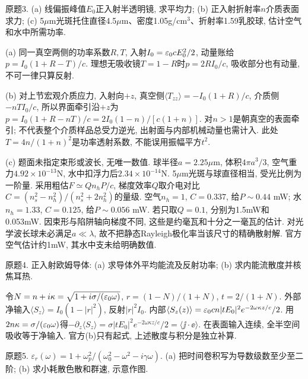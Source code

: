 \begin{exercise}
原题3. (a) 线偏振峰值$E_0$正入射半透明镜, 求平均力; (b) 正入射折射率$n$介质表面求力; (c) 5$\mu$m光斑托住直径4.5$\mu$m、密度1.05g/cm$^3$、折射率1.59乳胶球, 估计空气和水中所需功率.
\end{exercise}
\begin{solution}
(a) 同一真空两侧的功率系数$R,T$, 入射$I_0=\varepsilon_0 cE_0^2/2$, 动量账给$p=I_0(1+R-T)/c$. 理想无吸收镜$T=1-R$时$p=2RI_0/c$, 吸收部分也有动量, 不可一律只算反射.

(b) 对上节宏观介质应力, 入射向$+z$, 真空侧$\langle T_{zz}\rangle=-I_0(1+R)/c$, 介质侧$-nTI_0/c$, 所以界面牵引沿$+z$为$p=I_0(1+R-nT)/c=2I_0(1-n)/[c(1+n)]$. 对$n>1$是朝真空的表面牵引; 不代表整个介质样品总受力逆光, 出射面与内部机械动量也需计入. 此处$T=4n/(1+n)^2$是功率透射系数, 不能误用振幅平方$t^2$.

(c) 题面未指定束形或波长, 无唯一数值. 球半径$a=2.25\mu$m, 体积$4\pi a^3/3$, 空气重力$4.92\times10^{-13}$N, 水中扣浮力后$2.34\times10^{-14}$N. 5$\mu$m光斑与球直径相当, 受光比例为一阶量. 采用粗估$F\simeq Q n_hP/c$, 梯度效率$Q$取介电对比$C=(n_s^2-n_h^2)/(n_s^2+2n_h^2)$的量级. 空气$n_h=1$, $C=0.337$, 给$P\sim0.44$ mW; 水$n_h=1.33$, $C=0.125$, 给$P\sim0.056$ mW. 若只取$Q=0.1$, 分别为1.5mW和0.053mW. 因束形与陷阱轴向梯度不同, 这些是约毫瓦和十分之一毫瓦的估计. 对光学波长球未必满足$a\ll\lambda$, 故不把静态Rayleigh极化率当该尺寸的精确散射解. 官方空气估计约1mW, 其水中支未给明确数值.
\end{solution}
\begin{exercise}
原题4. 正入射欧姆导体: (a) 求导体外平均能流及反射功率; (b) 求内能流散度并核焦耳热.
\end{exercise}
\begin{solution}
令$N=n+i\kappa=\sqrt{1+i\sigma/(\varepsilon_0\omega)}$, $r=(1-N)/(1+N)$, $t=2/(1+N)$. 外部净输入$\langle S_z\rangle=I_0(1-|r|^2)$, 反射$|r|^2I_0$. 内部$\langle S_z(z)\rangle=\varepsilon_0 c n|tE_0|^2e^{-2\omega\kappa z/c}/2$. 用$2n\kappa=\sigma/(\varepsilon_0\omega)$得$-\partial_z\langle S_z\rangle=\sigma|tE_0|^2e^{-2\omega\kappa z/c}/2=\langle\jj\cdot\ee\rangle$. 在表面输入连续, 全半空间吸收等于净输入. 官方(b)只有起式, 上述散度与积分是独立补算.
\end{solution}
\begin{exercise}
原题5. $\varepsilon_r(\omega)=1+\omega_p^2/(\omega_0^2-\omega^2-i\gamma\omega)$. (a) 把时间卷积写为导数级数至少至二阶; (b) 求小耗散色散和群速, 示意作图.
\end{exercise}
